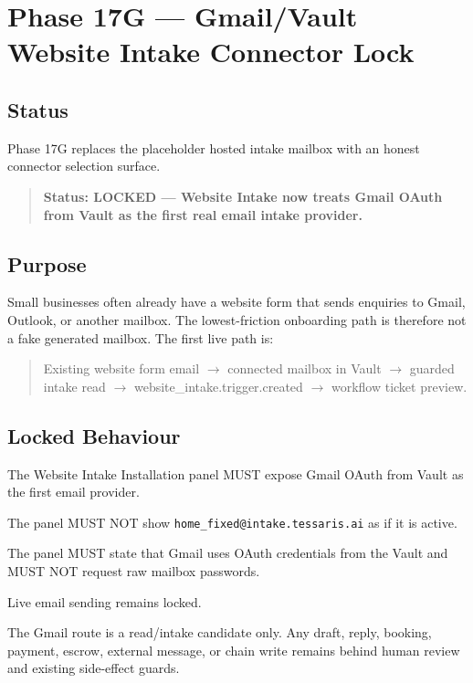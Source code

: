 \section{Phase 17G --- Gmail/Vault Website Intake Connector Lock}
\label{sec:aion-phase17g-gmail-vault-website-intake-connector-lock}

\subsection{Status}

Phase 17G replaces the placeholder hosted intake mailbox with an honest connector selection surface.

\begin{quote}
\textbf{Status: LOCKED --- Website Intake now treats Gmail OAuth from Vault as the first real email intake provider.}
\end{quote}

\subsection{Purpose}

Small businesses often already have a website form that sends enquiries to Gmail, Outlook, or another mailbox. The lowest-friction onboarding path is therefore not a fake generated mailbox. The first live path is:

\begin{quote}
Existing website form email $\rightarrow$ connected mailbox in Vault $\rightarrow$ guarded intake read $\rightarrow$ website\_intake.trigger.created $\rightarrow$ workflow ticket preview.
\end{quote}

\subsection{Locked Behaviour}

The Website Intake Installation panel MUST expose Gmail OAuth from Vault as the first email provider.

The panel MUST NOT show \texttt{home\_fixed@intake.tessaris.ai} as if it is active.

The panel MUST state that Gmail uses OAuth credentials from the Vault and MUST NOT request raw mailbox passwords.

Live email sending remains locked.

The Gmail route is a read/intake candidate only. Any draft, reply, booking, payment, escrow, external message, or chain write remains behind human review and existing side-effect guards.

